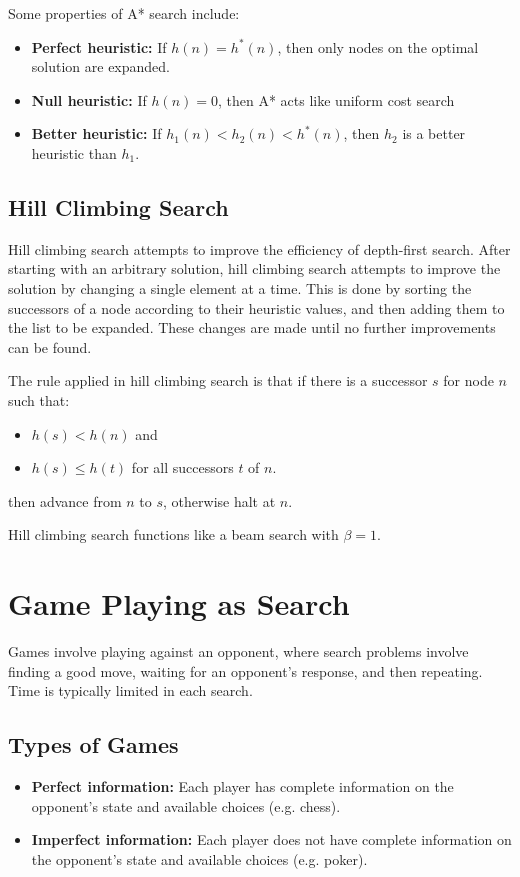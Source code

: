 \documentclass[12pt,titlepage]{article}
\let\stdsection\section
\renewcommand\section{\clearpage\stdsection}
\begin{document}
      Some properties of A* search include:
      \begin{itemize}
        \item \textbf{Perfect heuristic:} If $h(n) = h^*(n)$, then only nodes on the optimal solution are expanded.
        \item \textbf{Null heuristic:} If $h(n) = 0$, then A* acts like uniform cost search
        \item \textbf{Better heuristic:} If $h_1(n) < h_2(n) < h^*(n)$, then $h_2$ is a better heuristic than $h_1$.
      \end{itemize}

    \subsection{Hill Climbing Search}
      Hill climbing search attempts to improve the efficiency of depth-first search. After starting with an arbitrary solution, hill climbing
      search attempts to improve the solution by changing a single element at a time. This is done by sorting the successors of a node according
      to their heuristic values, and then adding them to the list to be expanded. These changes are made until no further improvements can be found.

      The rule applied in hill climbing search is that if there is a successor $s$ for node $n$ such that:
      \begin{itemize}
        \item $h(s) < h(n)$ and
        \item $h(s) \leq h(t)$ for all successors $t$ of $n$.
      \end{itemize}
      then advance from $n$ to $s$, otherwise halt at $n$.

      Hill climbing search functions like a beam search with $\beta = 1$.

  \section{Game Playing as Search}
    Games involve playing against an opponent, where search problems involve finding a good move, waiting for an opponent's response, and then
    repeating. Time is typically limited in each search.

    \subsection{Types of Games}
      \begin{itemize}
        \item \textbf{Perfect information:} Each player has complete information on the opponent's state and available choices (e.g. chess).
        \item \textbf{Imperfect information:} Each player does not have complete information on the opponent's state and available choices (e.g. poker).
      \end{itemize}
\end{document}
